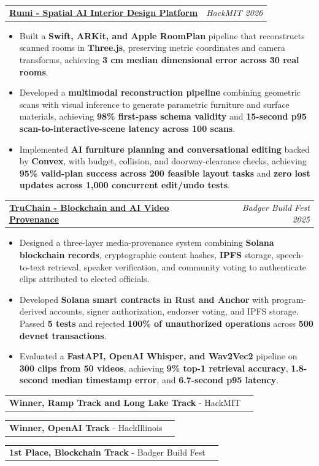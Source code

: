\documentclass[10pt,letterpaper]{article}
\makeatletter
\newcommand{\resumeFallback}[1]{{\resumeFallbackFont#1}}
\newcommand{\resumeSection}[1]{%
  \par\vspace{2.7pt}%
  {\fontsize{11.5}{12}\selectfont\bfseries
    \underline{\makebox[\linewidth][l]{#1}}%
  }%
  \par\vspace{2.1pt}%
}
\newcommand{\projectEntry}[2]{%
  \begin{tabular*}{\linewidth}{@{}l@{\extracolsep{\fill}}r@{}}
    \textbf{\underline{#1}} & {\resumeBulletFont\itshape #2\/}
  \end{tabular*}\par
}
\newcommand{\awardEntry}[3]{%
  \begin{tabular*}{\linewidth}{@{}l@{\extracolsep{\fill}}r@{}}
    \textbf{#1} - #2 & {\resumeBulletFont #3}
  \end{tabular*}\par
}
\newenvironment{resumeItems}{%
  \begin{itemize}[
    leftmargin=0.50in,
    label={\resumeBulletFont\textbullet},
    labelsep=0.18in,
    labelwidth=0.10in,
    itemindent=0pt,
    topsep=0pt,
    partopsep=0pt,
    parsep=0pt,
    itemsep=0.25pt
  ]
}{%
  \end{itemize}\vspace{-1.6pt}
}
\newcommand{\resumeEntryGap}{\par\vspace{2.4pt}}
\makeatother
\begin{document}
\resumeEntryGap
\projectEntry
  {Rumi - Spatial AI Interior Design Platform}
  {HackMIT 2026}
\begin{resumeItems}
  \item Built a \textbf{Swift, ARKit, and Apple RoomPlan} pipeline that reconstructs scanned rooms in \textbf{Three.js}, preserving metric coordinates and camera transforms, achieving \textbf{3 cm median dimensional error across 30 real rooms}.
  \item Developed a \textbf{multimodal reconstruction pipeline} combining geometric scans with visual inference to generate parametric furniture and surface materials, achieving \textbf{98\% first-pass schema validity} and \textbf{15-second p95 scan-to-interactive-scene latency across 100 scans}.
  \item Implemented \textbf{AI furniture planning and conversational editing} backed by \textbf{Convex}, with budget, collision, and doorway-clearance checks, achieving \textbf{95\% valid-plan success across 200 feasible layout tasks} and \textbf{zero lost updates across 1,000 concurrent edit/undo tests}.
\end{resumeItems}

\resumeEntryGap
\projectEntry
  {\href{https://github.com/IBS27/truchain}{TruChain - Blockchain and AI Video Provenance}}
  {Badger Build Fest 2025}
\begin{resumeItems}
  \item Designed a three-layer media-provenance system combining \textbf{Solana blockchain records}, cryptographic content hashes, \textbf{IPFS} storage, speech-to-text retrieval, speaker verification, and community voting to authenticate clips attributed to elected officials.
  \item Developed \textbf{Solana smart contracts in Rust and Anchor} with program-derived accounts, signer authorization, endorser voting, and IPFS storage. Passed \textbf{\resumeFallback{4}5 tests} and rejected \textbf{100\% of unauthorized operations} across \textbf{500 devnet transactions}.
  \item Evaluated a \textbf{FastAPI, OpenAI Whisper, and Wav2Vec2} pipeline on \textbf{300 clips from 50 videos}, achieving \textbf{9\resumeFallback{4}\% top-1 retrieval accuracy}, \textbf{1.8-second median timestamp error}, and \textbf{6.7-second p95 latency}.
\end{resumeItems}

\resumeSection{HONORS \& AWARDS}
\awardEntry{Winner, Ramp Track and Long Lake Track}{HackMIT}{2026}
\awardEntry{Winner, OpenAI Track}{HackIllinois}{2026}
\awardEntry{1st Place, Blockchain Track}{Badger Build Fest}{2025}
\end{document}
